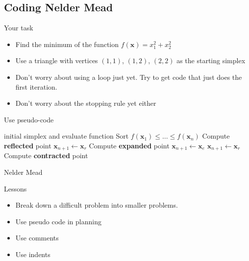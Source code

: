 \documentclass[10pt]{beamer}
\begin{document}
\subsection{Coding Nelder Mead}
\begin{frame}{Your task}
  \begin{itemize}
  \item Find the minimum of the function $f({\bm x})=x_1^2+x_2^2$

  \item Use a triangle with vertices $(1,1)$, $(1,2)$, $(2,2)$ as the starting simplex

  \item Don't worry about using a loop just yet.  Try to get code that just does the first iteration.

  \item Don't worry about the stopping rule yet either
  \end{itemize}
\end{frame}
\begin{frame}{Use pseudo-code}
  \begin{algorithm}[H]
    \begin{algorithmic}[1]
       initial simplex and evaluate function
      \STATE Sort $f({\bm x_1})\leq\ldots\leq f({\bm x_n}) $
      \STATE Compute {\bf reflected} point
      \RETURN ${\bm x_{n+1}}\gets{\bm x_{r}}$
      \STATE Compute {\bf expanded} point
      \RETURN ${\bm x_{n+1}}\gets{\bm x_{e}}$
      \RETURN ${\bm x_{n+1}}\gets{\bm x_{r}}$
      \ENDIF
      \STATE Compute {\bf contracted} point
      \ENDIF
      \caption{Nelder Mead}
    \end{algorithmic}
  \end{algorithm}
\end{frame}
\begin{frame}{Lessons}
  \begin{itemize}
  \item Break down a difficult problem into smaller problems.

  \item Use pseudo code in planning

  \item Use comments

  \item Use indents
  \end{itemize}
\end{frame}
\end{document}
